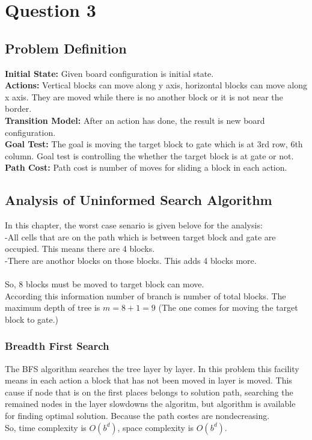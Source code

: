 \documentclass[a4paper,11pt]{report}
\begin{document}
\section*{Question 3}
\subsection*{Problem Definition}
\textbf{Initial State: }Given board configuration is initial state.\\
\textbf{Actions: }Vertical blocks can move along y axis, horizontal blocks can move along x axis.
They are moved while there is no another block or it is not near the border.\\
\textbf{Transition Model: }After an action has done, the result is new board configuration.\\
\textbf{Goal Test: }The goal is moving the target block to gate which is at 3rd row, 6th column. 
Goal test is controlling the whether the target block is at gate or not.\\
\textbf{Path Cost: }Path cost is number of moves for sliding a block in each action.\\ 
\subsection*{Analysis of Uninformed Search Algorithm}
In this chapter, the worst case senario is given belove for the analysis:\\
-All cells that are on the path which is between target block and gate are occupied. This means there are 4 blocks.\\
-There are anothor blocks on those blocks. This adds 4 blocks more.\\
\\So, 8 blocks must be moved to target block can move.\\
According this information number of branch is number of total blocks. The maximum depth of tree is $m = 8 + 1 = 9$ 
(The one comes for moving the target block to gate.)

\subsubsection*{Breadth First Search}
The BFS algorithm searches the tree layer by layer. In this problem this facility means in each action a block 
that has not been moved in layer is moved. This cause if node that is on the first places belongs to solution path, 
searching the remained nodes in the layer slowdowns the algoritm, but algorithm is available for finding optimal solution.
Because the path costes are nondecreasing.\\
So, time complexity is $O(b^{d})$, space complexity is $O(b^{d})$.
\end{document}
